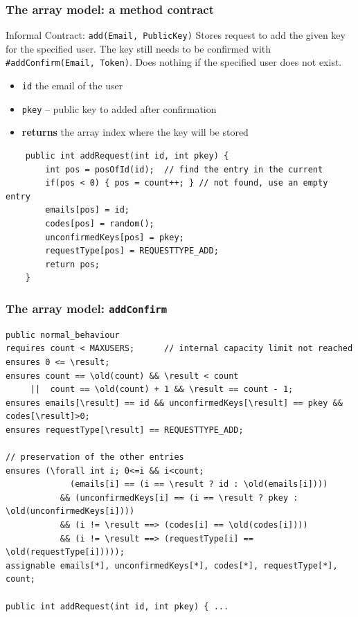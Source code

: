 \documentclass{beamer}
\begin{document}
\begin{frame}[fragile]
    \frametitle{The array model: a method contract}
    \begin{block}{Informal Contract: \texttt{add(Email, PublicKey)}}
      Stores request to add the given key for the specified user. The key still
      needs to be confirmed with \texttt{\#addConfirm(Email, Token)}. Does nothing if
      the specified user does not exist.
     
    \begin{itemize}
    \item \texttt{id} the email of the user
     \item \texttt{pkey}  -- public key to added after confirmation
     \item \textbf{returns} the array index where the key will be stored
    \end{itemize}
     
    \end{block}
    
    \begin{lstlisting}
    public int addRequest(int id, int pkey) {
        int pos = posOfId(id);  // find the entry in the current
        if(pos < 0) { pos = count++; } // not found, use an empty entry
        emails[pos] = id;
        codes[pos] = random(); 
        unconfirmedKeys[pos] = pkey;
        requestType[pos] = REQUESTTYPE_ADD;
        return pos;
    }
    \end{lstlisting}
\end{frame}

\begin{frame}[fragile]
    \frametitle{The array model: \texttt{addConfirm}}
\begin{lstlisting}
public normal_behaviour
requires count < MAXUSERS;      // internal capacity limit not reached
ensures 0 <= \result;           
ensures count == \old(count) && \result < count
     ||  count == \old(count) + 1 && \result == count - 1;
ensures emails[\result] == id && unconfirmedKeys[\result] == pkey && codes[\result]>0;
ensures requestType[\result] == REQUESTTYPE_ADD;

// preservation of the other entries
ensures (\forall int i; 0<=i && i<count;
             (emails[i] == (i == \result ? id : \old(emails[i])))
           && (unconfirmedKeys[i] == (i == \result ? pkey : \old(unconfirmedKeys[i])))
           && (i != \result ==> (codes[i] == \old(codes[i])))
           && (i != \result ==> (requestType[i] == \old(requestType[i]))));
assignable emails[*], unconfirmedKeys[*], codes[*], requestType[*], count;

public int addRequest(int id, int pkey) { ...
\end{lstlisting}
\end{frame}
\end{document}
